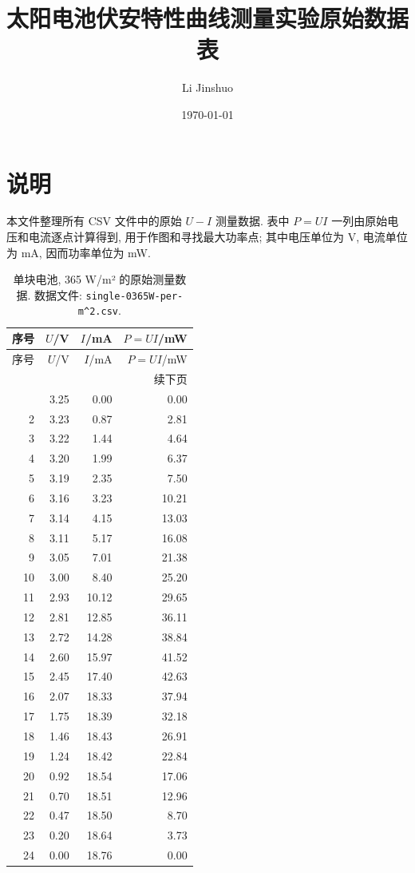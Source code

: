 \documentclass[UTF8,a4paper,11pt]{ctexart}
\title{太阳电池伏安特性曲线测量实验原始数据表}
\author{Li Jinshuo}
\date{\today}
\begin{document}
\maketitle
\tableofcontents
\newpage
\section*{说明}
本文件整理所有 CSV 文件中的原始 $U-I$ 测量数据. 表中 $P=UI$ 一列由原始电压和电流逐点计算得到, 用于作图和寻找最大功率点; 其中电压单位为 V, 电流单位为 mA, 因而功率单位为 mW.
\newpage
\begin{longtable}{rrrr}
\caption{单块电池, 365 W/m² 的原始测量数据. 数据文件: \texttt{single-0365W-per-m\textasciicircum{}2.csv}.}\\
\toprule
序号 & $U$/V & $I$/mA & $P=UI$/mW \\
\midrule
\endfirsthead
\toprule
序号 & $U$/V & $I$/mA & $P=UI$/mW \\
\midrule
\endhead
\midrule
\multicolumn{4}{r}{续下页} \\
\endfoot
\bottomrule
\endlastfoot
1 & 3.25 & 0.00 & 0.00 \\
2 & 3.23 & 0.87 & 2.81 \\
3 & 3.22 & 1.44 & 4.64 \\
4 & 3.20 & 1.99 & 6.37 \\
5 & 3.19 & 2.35 & 7.50 \\
6 & 3.16 & 3.23 & 10.21 \\
7 & 3.14 & 4.15 & 13.03 \\
8 & 3.11 & 5.17 & 16.08 \\
9 & 3.05 & 7.01 & 21.38 \\
10 & 3.00 & 8.40 & 25.20 \\
11 & 2.93 & 10.12 & 29.65 \\
12 & 2.81 & 12.85 & 36.11 \\
13 & 2.72 & 14.28 & 38.84 \\
14 & 2.60 & 15.97 & 41.52 \\
15 & 2.45 & 17.40 & 42.63 \\
16 & 2.07 & 18.33 & 37.94 \\
17 & 1.75 & 18.39 & 32.18 \\
18 & 1.46 & 18.43 & 26.91 \\
19 & 1.24 & 18.42 & 22.84 \\
20 & 0.92 & 18.54 & 17.06 \\
21 & 0.70 & 18.51 & 12.96 \\
22 & 0.47 & 18.50 & 8.70 \\
23 & 0.20 & 18.64 & 3.73 \\
24 & 0.00 & 18.76 & 0.00 \\
\end{longtable}
\newpage
\end{document}
